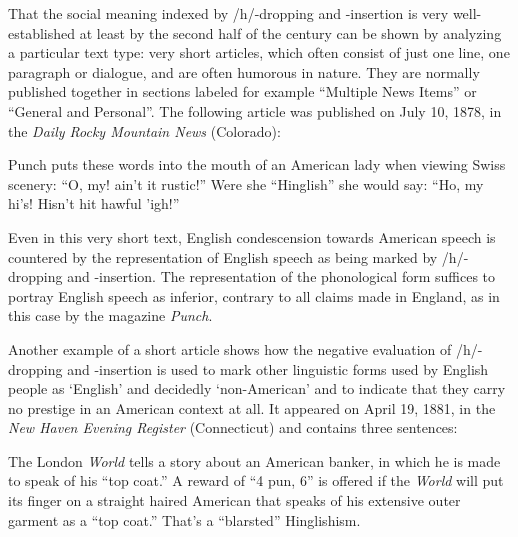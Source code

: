 That the social meaning indexed by /h/-dropping and -insertion is very well-established at least by the second half of the century can be shown by analyzing a particular text type: very short articles, which often consist of just one line, one paragraph or dialogue, and are often humorous in nature. They are normally published together in sections labeled for example “Multiple News Items” or “General and Personal”. The following article was published on July 10, 1878, in the \emph{Daily Rocky Mountain News} (Colorado):

\begin{ipquote}
Punch puts these words into the mouth of an American lady when viewing Swiss scenery: “O, my! ain't it rustic!” Were she “Hinglish” she would say: “Ho, my hi's! Hisn't hit hawful 'igh!”
\end{ipquote}


Even in this very short text, English condescension towards American speech is countered by the representation of English speech as being marked by /h/-dropping and -insertion. The representation of the phonological form suffices to portray English speech as inferior, contrary to all claims made in England, as in this case by the magazine \emph{Punch}.


Another example of a short article shows how the negative evaluation of /h/-dropping and -insertion is used to mark other linguistic forms used by English people as ‘English’ and decidedly ‘non-American’ and to indicate that they carry no prestige in an American context at all. It appeared on April 19, 1881, in the \emph{New Haven Evening Register} (Connecticut) and contains three sentences:

\begin{ipquote}
The London \emph{World} tells a story about an American banker, in which he is made to speak of his “top coat.” A reward of “4 pun, 6” is offered if the \emph{World} will put its finger on a straight haired American that speaks of his extensive outer garment as a “top coat.” That’s a “blarsted” Hinglishism.
\end{ipquote}


